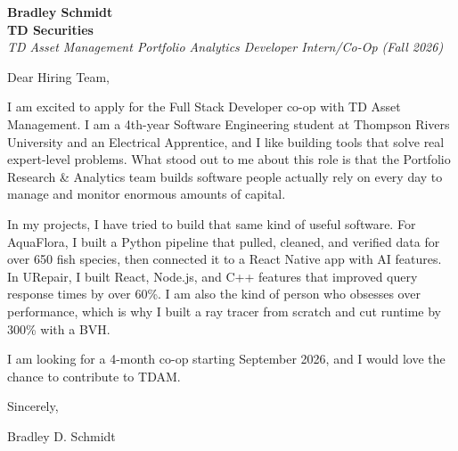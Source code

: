 \documentclass[11pt]{article}
\begin{document}
\textbf{Bradley Schmidt}\\
\vspace{0.5em}
\textbf{TD Securities}\\
\textit{TD Asset Management Portfolio Analytics Developer Intern/Co-Op (Fall 2026)}

Dear Hiring Team,

\par

I am excited to apply for the Full Stack Developer co-op with TD Asset Management. I am a 4th-year Software Engineering student at Thompson Rivers University and an Electrical Apprentice, and I like building tools that solve real expert-level problems. What stood out to me about this role is that the Portfolio Research \& Analytics team builds software people actually rely on every day to manage and monitor enormous amounts of capital.

\par

In my projects, I have tried to build that same kind of useful software. For AquaFlora, I built a Python pipeline that pulled, cleaned, and verified data for over 650 fish species, then connected it to a React Native app with AI features. In URepair, I built React, Node.js, and C++ features that improved query response times by over 60\%. I am also the kind of person who obsesses over performance, which is why I built a ray tracer from scratch and cut runtime by 300\% with a BVH.

\par

I am looking for a 4-month co-op starting September 2026, and I would love the chance to contribute to TDAM.

\par

Sincerely,

\par

Bradley D. Schmidt
\end{document}
